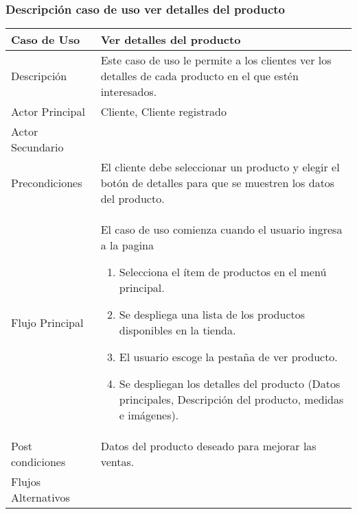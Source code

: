 \documentclass[12pt,a4paper]{article}
\begin{document}
\subsubsection*{Descripción caso de uso ver detalles del producto}
\begin{table}[h]
        \centering
        \begin{tabular}{| p{3cm}| p{11cm} |} 
        \hline  
        Caso de Uso         &    \textbf{Ver detalles del producto }   \\ 
        \hline
        Descripción         &    Este caso de uso le permite a los clientes ver los detalles de cada producto en el que estén interesados.   \\ 
        \hline
        Actor Principal     &     Cliente, Cliente registrado \\ 
        \hline
        Actor Secundario    &       \\ 
        \hline
        Precondiciones      &    El cliente debe seleccionar un producto y elegir el botón de detalles para que se muestren los datos del producto. 	\\
        \hline
        Flujo Principal     &   El caso de uso comienza cuando el usuario ingresa a la pagina  

            \begin{enumerate}
                \item  Selecciona el ítem de productos en el menú principal.
                \item Se despliega una lista de los productos disponibles en la tienda.
                \item El usuario escoge la pestaña de ver producto.
                \item Se despliegan los detalles del producto (Datos principales, Descripción del producto, medidas e imágenes).
            \end{enumerate}
        \\  
        \hline
        Post condiciones    &   Datos del producto deseado para mejorar las ventas.    \\  
        \hline
        Flujos Alternativos &       \\  
        \hline
        \end{tabular}
    \end{table}

\newpage
\end{document}
